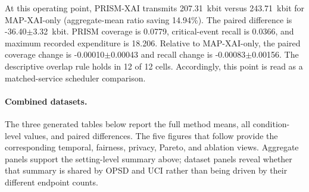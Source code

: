 At this operating point, PRISM-XAI transmits 207.31~kbit versus 243.71~kbit for MAP-XAI-only (aggregate-mean ratio saving 14.94\%). The paired difference is -36.40$\pm$3.32~kbit. PRISM coverage is 0.0779, critical-event recall is 0.0366, and maximum recorded expenditure is 18.206. Relative to MAP-XAI-only, the paired coverage change is -0.00010$\pm$0.00043 and recall change is -0.00083$\pm$0.00156. The descriptive overlap rule holds in 12 of 12 cells. Accordingly, this point is read as a matched-service scheduler comparison.

\paragraph{Combined datasets.} The three generated tables below report the full method means, all condition-level values, and paired differences. The five figures that follow provide the corresponding temporal, fairness, privacy, Pareto, and ablation views. Aggregate panels support the setting-level summary above; dataset panels reveal whether that summary is shared by OPSD and UCI rather than being driven by their different endpoint counts.

\begin{table}[p]\centering\tiny

\caption{Public-score threshold $\tau=3$, release cap $M=8$, Combined datasets: complete generated method table.}

\label{tab:thr_3_cap_8:combined:main}

\resizebox{\linewidth}{!}{}

\end{table}\clearpage

\begin{table}[p]\centering\tiny

\caption{Public-score threshold $\tau=3$, release cap $M=8$, Combined datasets: complete condition-level generated table.}

\label{tab:thr_3_cap_8:combined:conditions}

\resizebox{\textwidth}{!}{}

\end{table}\clearpage

\begin{table}[p]\centering\tiny

\caption{Public-score threshold $\tau=3$, release cap $M=8$, Combined datasets: complete generated paired comparisons.}

\label{tab:thr_3_cap_8:combined:paired}

\resizebox{\textwidth}{!}{}

\end{table}\clearpage

